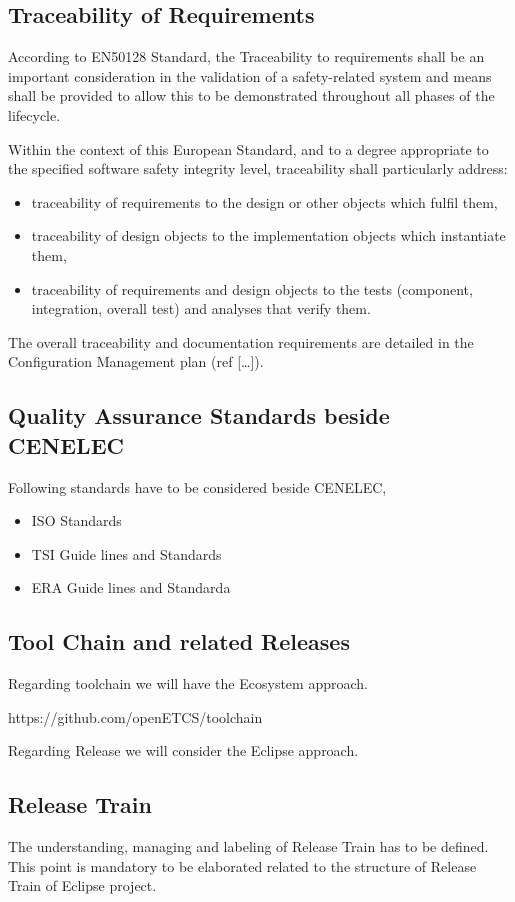 \documentclass{template/openetcs_article}
\begin{document}
\subsection{Traceability of Requirements}
According to EN50128 Standard, the Traceability to requirements shall be an important consideration in the validation of a safety-related system and means shall be provided to allow this to be demonstrated throughout all phases of the lifecycle.

Within the context of this European Standard, and to a degree appropriate to the specified software safety integrity level, traceability shall particularly address:
\begin{itemize}
\item traceability of requirements to the design or other objects which fulfil them,
\item traceability of design objects to the implementation objects which instantiate them,
\item traceability of requirements and design objects to the tests (component, integration, overall test) and analyses that verify them.
\end{itemize}
The overall traceability and documentation requirements are detailed in the Configuration Management plan (ref [{\dots}]).


\subsection{Quality Assurance Standards beside CENELEC }
Following standards have to be considered beside CENELEC,
\begin{itemize}
\item ISO Standards
\item TSI Guide lines and Standards
\item ERA Guide lines and Standarda
\end{itemize}


\subsection{Tool Chain and related Releases}
Regarding toolchain we will have the Ecosystem approach. 

https://github.com/openETCS/toolchain

Regarding Release we will consider the Eclipse approach.


\subsection{Release Train}
The understanding, managing and labeling of Release Train has to be defined. This point is mandatory to be elaborated related to the structure of Release Train of Eclipse project.
\end{document}
